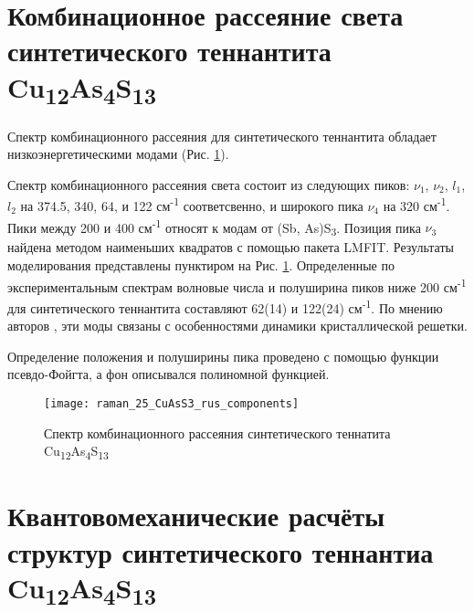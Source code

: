 \newpage



\section{Комбинационное рассеяние света синтетического теннантита Cu\textsubscript{12}As\textsubscript{4}S\textsubscript{13}} \label{sect3_3}

Спектр комбинационного рассеяния для синтетического теннантита обладает низкоэнергетическими модами (Рис. \ref{img:raman1a}).

Спектр комбинационного рассеяния света состоит из следующих пиков: $\nu_{1}$, $\nu_{2}$, $l_{1}$, $l_{2}$ на 374.5, 340, 64, и 122 см\textsuperscript{-1} соответсвенно, и широкого пика $\nu_{4}$ на 320 см\textsuperscript{-1}. Пики между 200 и 400 см\textsuperscript{-1} относят к модам от (Sb, As)S\textsubscript{3}\cite{Kharbish2007}. Позиция пика $\nu_{3}$ найдена методом наименьших квадратов с помощью пакета LMFIT.
Результаты моделирования представлены пунктиром на Рис. \ref{img:raman1a}.
Определенные по экспериментальным спектрам волновые числа и полуширина пиков ниже 200 см\textsuperscript{-1} для синтетического теннантита составляют 62(14) и 122(24) см\textsuperscript{-1}.  По мнению авторов \cite{Buzatu2017}, эти моды связаны с особенностями динамики кристаллической решетки.

Определение положения  и  полуширины пика проведено с помощью функции псевдо-Фойгта, а фон описывался полиномной функцией.

\begin{figure}[h]
    \texttt{[image: raman\_25\_CuAsS3\_rus\_components]}

      \caption[Спектр комбинационного рассеяния синтетического теннатита Cu\textsubscript{12}As\textsubscript{4}S\textsubscript{13}]{Спектр комбинационного рассеяния синтетического теннатита Cu\textsubscript{12}As\textsubscript{4}S\textsubscript{13}}

    \label{img:raman1a}
\end{figure}

\newpage


\section{Квантовомеханические расчёты структур синтетического теннантиа Cu\textsubscript{12}As\textsubscript{4}S\textsubscript{13}} \label{sect3_4}


